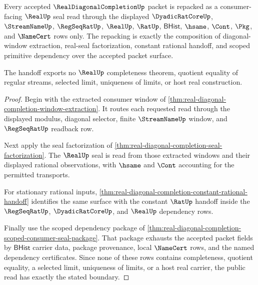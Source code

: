 \begin{theorem}
\label{thm:real-diagonal-completion-public-realup-handoff}
Every accepted $\RealDiagonalCompletionUp$ packet is repacked as a consumer-facing $\RealUp$ seal read through the displayed $\DyadicRatCoreUp$, $\StreamNameUp$, $\RegSeqRatUp$, $\RealUp$, $\RatUp$, $\mathsf{BHist}$, $\hsame$, $\Cont$, $\Pkg$, and $\NameCert$ rows only. The repacking is exactly the composition of diagonal-window extraction, real-seal factorization, constant rational handoff, and scoped primitive dependency over the accepted packet surface.

The handoff exports no $\RealUp$ completeness theorem, quotient equality of regular streams, selected limit, uniqueness of limits, or host real construction.
\end{theorem}
\begin{proof}
Begin with the extracted consumer window of \autoref{thm:real-diagonal-completion-window-extraction}. It routes each requested read through the displayed modulus, diagonal selector, finite $\StreamNameUp$ window, and $\RegSeqRatUp$ readback row.

Next apply the seal factorization of \autoref{thm:real-diagonal-completion-seal-factorization}. The $\RealUp$ seal is read from those extracted windows and their displayed rational observations, with $\hsame$ and $\Cont$ accounting for the permitted transports.

For stationary rational inputs, \autoref{thm:real-diagonal-completion-constant-rational-handoff} identifies the same surface with the constant $\RatUp$ handoff inside the $\RegSeqRatUp$, $\DyadicRatCoreUp$, and $\RealUp$ dependency rows.

Finally use the scoped dependency package of \autoref{thm:real-diagonal-completion-scoped-consumer-seal-package}. That package exhausts the accepted packet fields by $\mathsf{BHist}$ carrier data, package provenance, local $\NameCert$ rows, and the named dependency certificates. Since none of these rows contains completeness, quotient equality, a selected limit, uniqueness of limits, or a host real carrier, the public read has exactly the stated boundary.
\end{proof}

